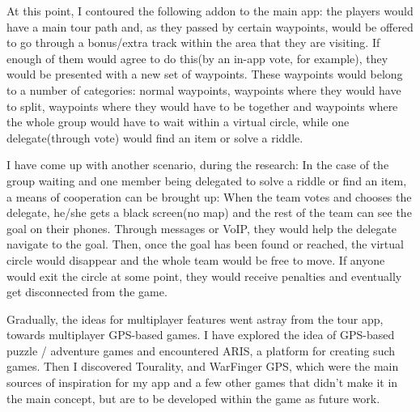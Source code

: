 \documentclass{article}
\begin{document}
At this point, I contoured the following addon to the main app: the players
would have a main tour path and, as they passed by certain waypoints, would be
offered to go through a bonus/extra track within the area that they are
visiting. If enough of them would agree to do this(by an in-app vote, for
example), they would be presented with a new set of waypoints. These waypoints
would belong to a number of categories: normal waypoints, waypoints where they
would have to split, waypoints where they would have to be together and
waypoints where the whole group would have to wait within a virtual circle,
while one delegate(through vote) would find an item or solve a riddle.\newline

I have come up with another scenario, during the research: In the case of the
group waiting and one member being delegated to solve a riddle or find an item,
a means of cooperation can be brought up: When the team votes and chooses the
delegate, he/she gets a black screen(no map) and the rest of the team can see
the goal on their phones. Through messages or VoIP, they would help the delegate
navigate to the goal. Then, once the goal has been found or reached, the virtual
circle would disappear and the whole team would be free to move. If anyone would
exit the circle at some point, they would receive penalties and eventually get
disconnected from the game.\newline

Gradually, the ideas for multiplayer features went astray from the tour app,
towards multiplayer GPS-based games. I have explored the idea of GPS-based
puzzle / adventure games and encountered ARIS, a platform for creating such
games. Then I discovered Tourality, and WarFinger GPS, which were the main
sources of inspiration for my app and a few other games that didn't make it in
the main concept, but are to be developed within the game as future
work.\newline
\end{document}
